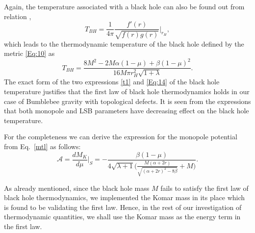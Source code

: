 \documentclass[aps,amsmath,amssymb,showpacs,showkeys]{revtex4}
\begin{document}
Again, the temperature associated with a black hole can also be found out 
from relation \cite{18},
\begin{equation}
T_{BH}=\frac{1}{4\pi}\frac{f'(r)}{\sqrt{f(r) g(r)}}\Big|_{r_H},
\label{Eq:13}
\end{equation}
which leads to the thermodynamic temperature of the black hole defined by the 
metric \eqref{Eq:10} as
\begin{equation}
T_{BH}=\frac{8M^2 -2M \alpha(1-\mu)+\beta(1-\mu)^2}{16M \pi r_H^2 \sqrt{1+\lambda}}.
\label{Eq:14}
\end{equation}
 The exact form of the two expressions \eqref{t1} and \eqref{Eq:14} of the 
black hole temperature justifies that the first law of black hole 
thermodynamics holds in our case of Bumblebee gravity with topological 
defects. It is seen from the expressions that both monopole and LSB parameters
have decreasing effect on the black hole temperature.

For the completeness we can derive the expression for the monopole potential 
from Eq.\ \eqref{mtl} as follows:
\begin{equation}
    \mathcal{A}=\frac{dM_K}{d\mu}\Big|_{S}=-\frac{\beta  (1-\mu )}{4 \sqrt{\lambda +1} \Big(\frac{M (\alpha +2 r)}{\sqrt{(\alpha +2 r)^2-8 \beta }}+M\Big)}.
\end{equation}

As already mentioned, since the black hole mass $M$ fails to satisfy the first 
law of black hole thermodynamics, we implemented the Komar mass in its place 
which is found to be validating the first law. Hence, in the rest of our 
investigation of thermodynamic quantities, we shall use the Komar mass as 
the energy term in the first law.
\end{document}
